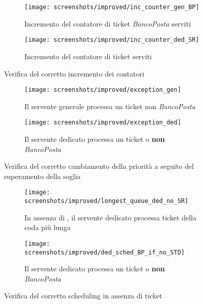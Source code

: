 \begin{figure}[ht]
\centering
\captionsetup[subfigure]{justification=centering}
\begin{subfigure}[b]{0.475\textwidth}
\centering
\texttt{[image: screenshots/improved/inc\_counter\_gen\_BP]}
\caption{Incremento del contatore di ticket \textsl{BancoPosta} serviti}    
\label{fig:miglioria-verifica-1a}
\end{subfigure}
\hfill    
\begin{subfigure}[b]{0.475\textwidth} 
\centering 
\texttt{[image: screenshots/improved/inc\_counter\_ded\_SR]}
\caption{Incremento del contatore di ticket \sr{} serviti}    
\label{fig:miglioria-verifica-1b}
\end{subfigure}
\caption{Verifica del corretto incremento dei contatori}
\label{fig:miglioria-verifica-1}
\end{figure}

\begin{figure}[ht]
\centering
\captionsetup[subfigure]{justification=centering}
\begin{subfigure}[b]{0.475\textwidth}
\centering 
\texttt{[image: screenshots/improved/exception\_gen]}
\caption{Il servente generale processa un ticket non \textsl{BancoPosta}}   
\label{fig:miglioria-verifica-2a}
\end{subfigure}
\hfill
\begin{subfigure}[b]{0.475\textwidth}   
\centering 
\texttt{[image: screenshots/improved/exception\_ded]}
\caption{Il servente dedicato processa un ticket \uo{} o \pp{} \textbf{non} \textsl{BancoPosta}}    
\label{fig:miglioria-verifica-2b}
\end{subfigure}
\caption{Verifica del corretto cambiamento della priorità a seguito del superamento della soglia}
\label{fig:miglioria-verifica-2}
\end{figure}

\begin{figure}[ht]
\centering
\captionsetup[subfigure]{justification=centering}
\begin{subfigure}[b]{0.475\textwidth}  
\centering 
\texttt{[image: screenshots/improved/longest\_queue\_ded\_no\_SR]}
\caption{In assenza di \sr{}, il servente dedicato processa ticket della coda più lunga}   
\label{fig:miglioria-verifica-3a}
\end{subfigure}
\hfill
\begin{subfigure}[b]{0.475\textwidth}  
\centering 
\texttt{[image: screenshots/improved/ded\_sched\_BP\_if\_no\_STD]}
\caption{Il servente dedicato processa un ticket \uo{} o \pp{} \textbf{non} \textsl{BancoPosta}}    
\label{fig:miglioria-verifica-3b}
\end{subfigure}
\caption{Verifica del corretto scheduling in assenza di ticket \sr{}}
\label{fig:miglioria-verifica-3}
\end{figure}

